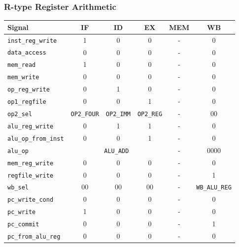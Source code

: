\documentclass{scrartcl}
\begin{document}
\subsubsection{R-type Register Arithmetic}
\begin{tabularx}{\textwidth}{ | X | c | c | c | c | c | }
  \hline
  \textbf{Signal} & \textbf{IF} & \textbf{ID} & \textbf{EX} & \textbf{MEM} & \textbf{WB} \\ \hline
  \texttt{inst\_reg\_write} & 1 & 0 & 0 & - & 0 \\ \hline
  \texttt{data\_access} & 0 & 0 & 0 & - & 0 \\ \hline
  \texttt{mem\_read} & 1 & 0 & 0 & - & 0 \\ \hline
  \texttt{mem\_write} & 0 & 0 & 0 & - & 0 \\ \hline
  \texttt{op\_reg\_write} & 0 & 1 & 0 & - & 0 \\ \hline
  \texttt{op1\_regfile} & 0 & 0 & 1 & - & 0 \\ \hline
  \texttt{op2\_sel} & \texttt{OP2\_FOUR} & \texttt{OP2\_IMM} & \texttt{OP2\_REG} & - & 00 \\ \hline
  \texttt{alu\_reg\_write} & 0 & 1 & 1 & - & 0 \\ \hline
  \texttt{alu\_op\_from\_inst} & 0 & 0 & 1 & - & 0 \\ \hline
  \texttt{alu\_op} & \multicolumn{3}{c|}{\texttt{ALU\_ADD}} & - & 0000 \\ \hline
  \texttt{mem\_reg\_write} & 0 & 0 & 0 & - & 0 \\ \hline
  \texttt{regfile\_write} & 0 & 0 & 0 & - & 1 \\ \hline
  \texttt{wb\_sel} & 00 & 00 & 00 & - & \texttt{WB\_ALU\_REG} \\ \hline
  \texttt{pc\_write\_cond} & 0 & 0 & 0 & - & 0 \\ \hline
  \texttt{pc\_write} & 1 & 0 & 0 & - & 0 \\ \hline
  \texttt{pc\_commit} & 0 & 0 & 0 & - & 1 \\ \hline
  \texttt{pc\_from\_alu\_reg} & 0 & 0 & 0 & - & 0 \\ \hline
\end{tabularx}
\end{document}
